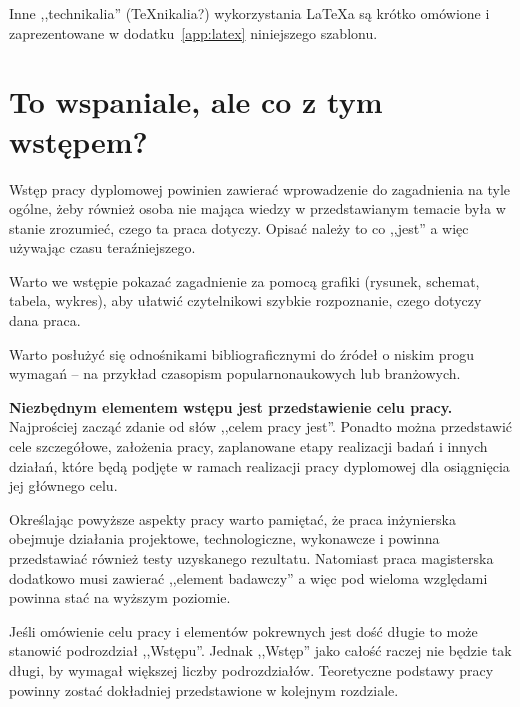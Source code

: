 Inne ,,technikalia'' (\TeX{nikalia}?) wykorzystania \LaTeX{a} są krótko omówione i zaprezentowane w dodatku~\ref{app:latex} niniejszego szablonu.

\section{To wspaniale, ale co z tym wstępem?}

Wstęp pracy dyplomowej powinien zawierać wprowadzenie do zagadnienia na tyle ogólne, żeby również osoba nie mająca wiedzy w przedstawianym temacie była w stanie zrozumieć, czego ta praca dotyczy. Opisać należy to co ,,jest'' a więc używając czasu teraźniejszego.

Warto we wstępie pokazać zagadnienie za pomocą grafiki (rysunek, schemat, tabela, wykres), aby ułatwić czytelnikowi szybkie rozpoznanie, czego dotyczy dana praca.

Warto posłużyć się odnośnikami bibliograficznymi do źródeł o niskim progu wymagań -- na przykład czasopism popularnonaukowych lub branżowych.

\textbf{Niezbędnym elementem wstępu jest przedstawienie celu pracy.} Najprościej zacząć zdanie od słów ,,celem pracy jest''. Ponadto można przedstawić cele szczegółowe, założenia pracy, zaplanowane etapy realizacji badań i innych działań, które będą podjęte w ramach realizacji pracy dyplomowej dla osiągnięcia jej głównego celu.

Określając powyższe aspekty pracy warto pamiętać, że praca inżynierska obejmuje działania projektowe, technologiczne, wykonawcze i powinna przedstawiać również testy uzyskanego rezultatu. Natomiast praca magisterska dodatkowo musi zawierać ,,element badawczy'' a więc pod wieloma względami powinna stać na wyższym poziomie.

Jeśli omówienie celu pracy i elementów pokrewnych jest dość długie to może stanowić podrozdział ,,Wstępu''. Jednak ,,Wstęp'' jako całość raczej nie będzie tak długi, by wymagał większej liczby podrozdziałów. Teoretyczne podstawy pracy powinny zostać dokładniej przedstawione w kolejnym rozdziale.